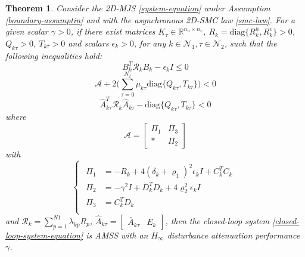 \documentclass[journal,final,twocolumn]{IEEEtran}
\newtheorem{theorem}{Theorem}
\begin{document}
\begin{theorem}\label{theorem1}
	Consider the  2D-MJS \eqref{system-equation} under Assumption \eqref{boundary-assumptin} and with the asynchronous 2D-SMC law \eqref{smc-law}. For a given scalar $\gamma>0$, if there exist matrices $K_{\tau }\in\mathbb{R}^{n_u\times n_x}$,  $R_{k}=\mathrm{diag}\{R^{h}_{k},R^{v}_{k}\}>0$,  $Q_{k\tau }>0$, $T_{k\tau }>0$ and scalars $\epsilon_{k}>0$, for any $k\in\mathcal{N}_{1}, \tau\in\mathcal{N}_{2}$,  such that the following inequalities hold: 
	\begin{equation}\label{T1C1}
	B^{T}_{k}  	\mathcal{R}_{k} B_{k} -\epsilon_{k}I \leq 0
	\end{equation}
	\begin{equation}\label{T1C2}
	\mathcal{A} +2\Big(\sum_{\tau =0}^{N_{2}}\mu_{k\tau } \mathrm{diag}\{Q_{k\tau }, T_{k\tau }\}\Big) < 0
	\end{equation}
	\begin{equation}\label{T1C3}
	\hat{A}^{T}_{k\tau }\mathcal{R}_{k}\hat{A}_{k\tau } - \mathrm{diag}\{Q_{k\tau }, T_{k\tau }\} < 0
	\end{equation}
	where
	\begin{equation*}
	\mathcal{A}=\begin{bmatrix}
	\varPi_{1} & \varPi_{3}\\
	*&\varPi_{2}
	\end{bmatrix}
	\end{equation*} with
	\begin{equation*} \label{varPi}
	\left\{
	\begin{array}{lr}
	\begin{split}
	\varPi_{1}&=-R_{k}+4(\delta_{k}+\varrho_{1})^{2}\epsilon_{k}I+C^{T}_{k}C_{k}\\
	\varPi_{2}&=-\gamma^{2}I+D^{T}_{k}D_{k}+4\varrho_{2}^{2}\epsilon_{k}I\\
	\varPi_{3}&= C_{k}^{T}D_{k}\\
	\end{split}
	\end{array}
	\right.
	\end{equation*}
	and $\mathcal{R}_{k}=\sum_{p=1}^{N1}\lambda_{kp}R_{p}$, $\hat{A}_{k\tau }=\begin{bmatrix}
	\bar{A}_{k\tau }& E_{k}
	\end{bmatrix}$, 
	then the closed-loop system \eqref{closed-loop-system-equation} is AMSS with an $H_{\infty}$ disturbance attenuation performance $\gamma$.
\end{theorem}
\end{document}
